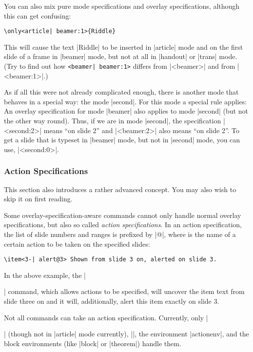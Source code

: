 You can also mix pure mode specifications and overlay specifications,
although this can get confusing:
\begin{verbatim}
\only<article| beamer:1>{Riddle}
\end{verbatim}

This will cause the text |Riddle| to be inserted in |article| mode and
on the first slide of a frame in |beamer| mode, but not at all in
|handout| or |trans| mode. (Try to find out how
\verb/<beamer| beamer:1>/ differs from |<beamer>| and from
|<beamer:1>|.)

As if all this were not already complicated enough, there is another
mode that behaves in a special way: the mode |second|. For this mode a
special rule applies: An overlay specification for mode |beamer| also
applies to mode |second| (but not the other way round). Thus, if we
are in mode |second|, the specification |<second:2>| means ``on slide
2'' and |<beamer:2>| also means ``on slide 2''. To get a slide that is
typeset in |beamer| mode, but not in |second| mode, you can use,
|<second:0>|.



\subsubsection{Action Specifications}
\label{section-action-specifications}

This section also introduces a rather advanced concept. You may
also wish to skip it on first reading.

Some overlay-specification-aware commands cannot only handle normal
overlay specifications, but also so called \emph{action
specifications}. In an action specification, the list of slide numbers
and ranges is prefixed by |@|, where  is the
name of a certain action to be taken on the specified slides:
\begin{verbatim}
\item<3-| alert@3> Shown from slide 3 on, alerted on slide 3.
\end{verbatim}
In the above example, the |\item| command, which allows actions to be
specified, will uncover the item text from slide three on and it will,
additionally, alert this item exactly on slide 3.

Not all commands can take an action specification. Currently, only
|\item| (though not in |article| mode currently), |\action|, the
environment |actionenv|, and the block environments (like |block| or
|theorem|) handle them.

